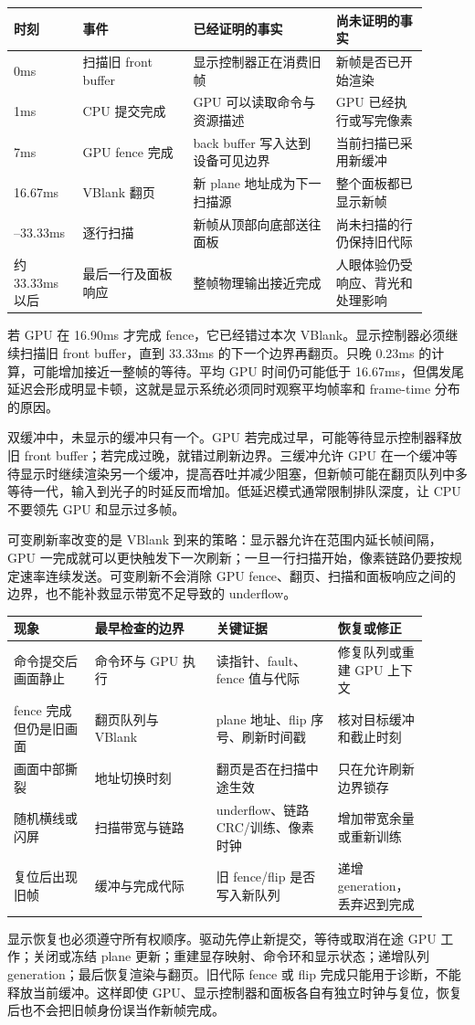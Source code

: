 \begin{longtable}{L{0.15\linewidth}L{0.24\linewidth}L{0.31\linewidth}L{0.20\linewidth}}
\toprule
时刻 & 事件 & 已经证明的事实 & 尚未证明的事实 \\
\midrule
0ms & 扫描旧 front buffer & 显示控制器正在消费旧帧 & 新帧是否已开始渲染 \\\tablerowrule
1ms & CPU 提交完成 & GPU 可以读取命令与资源描述 & GPU 已经执行或写完像素 \\\tablerowrule
7ms & GPU fence 完成 & back buffer 写入达到设备可见边界 & 当前扫描已采用新缓冲 \\\tablerowrule
16.67ms & VBlank 翻页 & 新 plane 地址成为下一扫描源 & 整个面板都已显示新帧 \\--33.33ms & 逐行扫描 & 新帧从顶部向底部送往面板 & 尚未扫描的行仍保持旧代际 \\\tablerowrule
约 33.33ms 以后 & 最后一行及面板响应 & 整帧物理输出接近完成 & 人眼体验仍受响应、背光和处理影响 \\
\bottomrule
\end{longtable}

若 GPU 在 16.90ms 才完成 fence，它已经错过本次 VBlank。显示控制器必须继续扫描旧 front buffer，直到 33.33ms 的下一个边界再翻页。只晚 0.23ms 的计算，可能增加接近一整帧的等待。平均 GPU 时间仍可能低于 16.67ms，但偶发尾延迟会形成明显卡顿，这就是显示系统必须同时观察平均帧率和 frame-time 分布的原因。


双缓冲中，未显示的缓冲只有一个。GPU 若完成过早，可能等待显示控制器释放旧 front buffer；若完成过晚，就错过刷新边界。三缓冲允许 GPU 在一个缓冲等待显示时继续渲染另一个缓冲，提高吞吐并减少阻塞，但新帧可能在翻页队列中多等待一代，输入到光子的时延反而增加。低延迟模式通常限制排队深度，让 CPU 不要领先 GPU 和显示过多帧。

可变刷新率改变的是 VBlank 到来的策略：显示器允许在范围内延长帧间隔，GPU 一完成就可以更快触发下一次刷新；一旦一行扫描开始，像素链路仍要按规定速率连续发送。可变刷新不会消除 GPU fence、翻页、扫描和面板响应之间的边界，也不能补救显示带宽不足导致的 underflow。

\begin{longtable}{L{0.18\linewidth}L{0.27\linewidth}L{0.27\linewidth}L{0.18\linewidth}}
\toprule
现象 & 最早检查的边界 & 关键证据 & 恢复或修正 \\
\midrule
命令提交后画面静止 & 命令环与 GPU 执行 & 读指针、fault、fence 值与代际 & 修复队列或重建 GPU 上下文 \\\tablerowrule
fence 完成但仍是旧画面 & 翻页队列与 VBlank & plane 地址、flip 序号、刷新时间戳 & 核对目标缓冲和截止时刻 \\\tablerowrule
画面中部撕裂 & 地址切换时刻 & 翻页是否在扫描中途生效 & 只在允许刷新边界锁存 \\\tablerowrule
随机横线或闪屏 & 扫描带宽与链路 & underflow、链路 CRC/训练、像素时钟 & 增加带宽余量或重新训练 \\\tablerowrule
复位后出现旧帧 & 缓冲与完成代际 & 旧 fence/flip 是否写入新队列 & 递增 generation，丢弃迟到完成 \\
\bottomrule
\end{longtable}

显示恢复也必须遵守所有权顺序。驱动先停止新提交，等待或取消在途 GPU 工作；关闭或冻结 plane 更新；重建显存映射、命令环和显示状态；递增队列 generation；最后恢复渲染与翻页。旧代际 fence 或 flip 完成只能用于诊断，不能释放当前缓冲。这样即使 GPU、显示控制器和面板各自有独立时钟与复位，恢复后也不会把旧帧身份误当作新帧完成。
